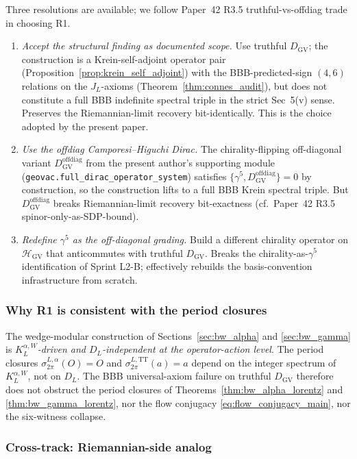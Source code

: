 \documentclass[11pt,a4paper]{article}
\theoremstyle{plain}
\theoremstyle{definition}
\newcommand{\Hilb}{\mathcal{H}}
\newcommand{\DGV}{D_{\mathrm{GV}}}
\newcommand{\DL}{D_{L}}
\newcommand{\KL}{K_{L}}
\newcommand{\JL}{J_{L}}
\newcommand{\TT}{\mathrm{TT}}
\begin{document}
Three resolutions are available; we follow Paper~42 R3.5
truthful-vs-offdiag trade in choosing R1.
\begin{enumerate}\setlength{\itemsep}{2pt}
\item[(R1)] \emph{Accept the structural finding as documented scope.}
Use truthful $\DGV$; the construction is a Krein-self-adjoint operator
pair (Proposition~\ref{prop:krein_self_adjoint}) with the
BBB-predicted-sign $(4, 6)$ relations on the $\JL$-axioms
(Theorem~\ref{thm:connes_audit}), but does not constitute a full
BBB indefinite spectral triple in the strict Sec~5(v) sense.
Preserves the Riemannian-limit recovery bit-identically. This is the
choice adopted by the present paper.
\item[(R2)] \emph{Use the offdiag Camporesi--Higuchi Dirac.} The
chirality-flipping off-diagonal variant
$\DGV^{\mathrm{offdiag}}$ from the present author's supporting module
(\texttt{geovac.full\_dirac\_operator\_system}) satisfies
$\{\gamma^5, \DGV^{\mathrm{offdiag}}\} = 0$ by construction, so the
construction lifts to a full BBB Krein spectral triple. But
$\DGV^{\mathrm{offdiag}}$ breaks Riemannian-limit recovery
bit-exactness (cf.\ Paper~42 R3.5 spinor-only-as-SDP-bound).
\item[(R3)] \emph{Redefine $\gamma^5$ as the off-diagonal grading.}
Build a different chirality operator on $\Hilb_{\mathrm{GV}}$ that
anticommutes with truthful $\DGV$. Breaks the chirality-as-$\gamma^5$
identification of Sprint L2-B; effectively rebuilds the basis-convention
infrastructure from scratch.
\end{enumerate}

\subsubsection{Why R1 is consistent with the period closures}

The wedge-modular construction of Sections~\ref{sec:bw_alpha} and
\ref{sec:bw_gamma} is \emph{$\KL^{\alpha, W}$-driven and
$\DL$-independent at the operator-action level}. The period closures
$\sigma_{2\pi}^{L, \alpha}(O) = O$ and $\sigma_{2\pi}^{L, \TT}(a) = a$
depend on the integer spectrum of $\KL^{\alpha, W}$, not on $\DL$.
The BBB universal-axiom failure on truthful $\DGV$ therefore does not
obstruct the period closures of Theorems~\ref{thm:bw_alpha_lorentz}
and \ref{thm:bw_gamma_lorentz}, nor the flow conjugacy
\eqref{eq:flow_conjugacy_main}, nor the six-witness collapse.

\subsubsection{Cross-track: Riemannian-side analog}
\end{document}
